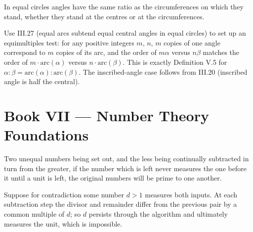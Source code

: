 \documentclass{rrxiv}
\begin{document}
\begin{claim}
\label{prop:VI.33}
In equal circles angles have the same ratio as the circumferences on
which they stand, whether they stand at the centres or at the
circumferences.
\end{claim}
\begin{evidence}[Proof of VI.33]
\label{ev:VI.33}
Use III.27 (equal arcs subtend equal central angles in equal circles)
to set up an equimultiples test: for any positive integers $m$, $n$,
$m$ copies of one angle correspond to $m$ copies of its arc, and the
order of $m \alpha$ versus $n \beta$ matches the order of $m \cdot
\mathrm{arc}(\alpha)$ versus $n \cdot \mathrm{arc}(\beta)$.  This is
exactly Definition V.5 for $\alpha : \beta = \mathrm{arc}(\alpha) :
\mathrm{arc}(\beta)$.  The inscribed-angle case follows from III.20
(inscribed angle is half the central).
\end{evidence}
%
%

\section{Book VII --- Number Theory Foundations}
\label{sec:book-VII}

\begin{claim}
\label{prop:VII.1}
Two unequal numbers being set out, and the less being continually
subtracted in turn from the greater, if the number which is left
never measures the one before it until a unit is left, the original
numbers will be prime to one another.
\end{claim}
\begin{evidence}
\label{ev:VII.1}
Suppose for contradiction some number $d > 1$ measures both inputs.
At each subtraction step the divisor and remainder differ from the
previous pair by a common multiple of $d$; so $d$ persists through
the algorithm and ultimately measures the unit, which is impossible.
\end{evidence}
\end{document}
